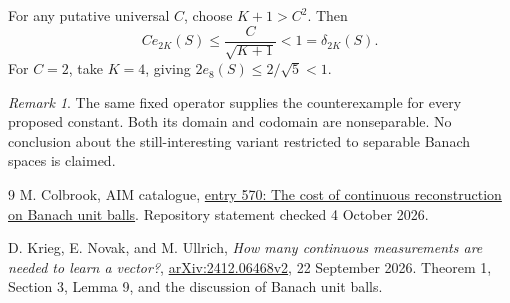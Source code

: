 \documentclass[11pt,a4paper]{article}
\theoremstyle{remark}
\newtheorem{remark}[theorem]{Remark}
\begin{document}
For any putative universal $C$, choose $K+1>C^2$. Then
\[
 C e_{2K}(S)\le\frac{C}{\sqrt{K+1}}<1=\delta_{2K}(S).
\]
For $C=2$, take $K=4$, giving $2e_8(S)\le2/\sqrt5<1$.

\begin{remark}
The same fixed operator supplies the counterexample for every proposed constant. Both its domain and codomain are nonseparable. No conclusion about the still-interesting variant restricted to separable Banach spaces is claimed.
\end{remark}



\begin{thebibliography}{9}
M. Colbrook, AIM catalogue, \href{https://github.com/MColbrook/AIM/blob/59a8f0c2957dd272f56bcf282dfe0c066a15f441/problems/570-continuous-decoder-banach-balls.md}{entry 570: The cost of continuous reconstruction on Banach unit balls}. Repository statement checked 4 October 2026.

D. Krieg, E. Novak, and M. Ullrich, \emph{How many continuous measurements are needed to learn a vector?}, \href{https://arxiv.org/abs/2412.06468v2}{arXiv:2412.06468v2}, 22 September 2026. Theorem 1, Section 3, Lemma 9, and the discussion of Banach unit balls.
\end{thebibliography}
\end{document}
